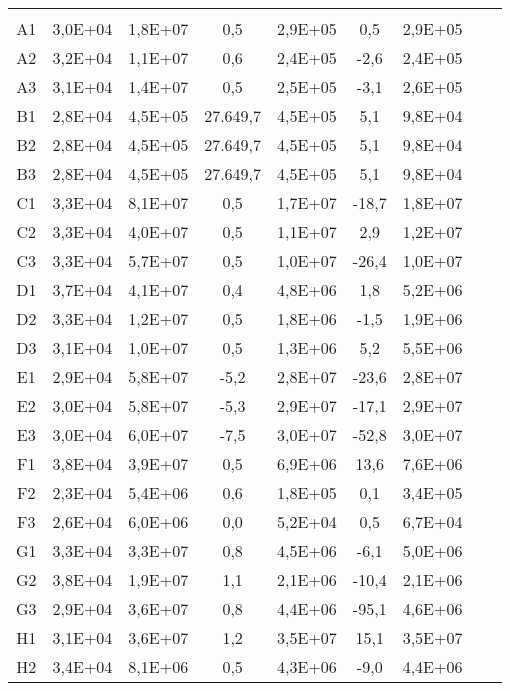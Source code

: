 \begin{center}
\begin{longtable}{ccccccccc}
\toprule
\endhead
\midrule \\ %
\endfoot
\bottomrule 
\endlastfoot
A1    & 3,0E+04 & 1,8E+07 & 0,5   & 2,9E+05 & 0,5   & 2,9E+05 \\
A2    & 3,2E+04 & 1,1E+07 & 0,6   & 2,4E+05 & -2,6  & 2,4E+05 \\
A3    & 3,1E+04 & 1,4E+07 & 0,5   & 2,5E+05 & -3,1  & 2,6E+05 \\
B1    & 2,8E+04 & 4,5E+05 & 27.649,7 & 4,5E+05 & 5,1   & 9,8E+04 \\
B2    & 2,8E+04 & 4,5E+05 & 27.649,7 & 4,5E+05 & 5,1   & 9,8E+04 \\
B3    & 2,8E+04 & 4,5E+05 & 27.649,7 & 4,5E+05 & 5,1   & 9,8E+04 \\
C1    & 3,3E+04 & 8,1E+07 & 0,5   & 1,7E+07 & -18,7 & 1,8E+07 \\
C2    & 3,3E+04 & 4,0E+07 & 0,5   & 1,1E+07 & 2,9   & 1,2E+07 \\
C3    & 3,3E+04 & 5,7E+07 & 0,5   & 1,0E+07 & -26,4 & 1,0E+07 \\
D1    & 3,7E+04 & 4,1E+07 & 0,4   & 4,8E+06 & 1,8   & 5,2E+06 \\
D2    & 3,3E+04 & 1,2E+07 & 0,5   & 1,8E+06 & -1,5  & 1,9E+06 \\
D3    & 3,1E+04 & 1,0E+07 & 0,5   & 1,3E+06 & 5,2   & 5,5E+06 \\
E1    & 2,9E+04 & 5,8E+07 & -5,2  & 2,8E+07 & -23,6 & 2,8E+07 \\
E2    & 3,0E+04 & 5,8E+07 & -5,3  & 2,9E+07 & -17,1 & 2,9E+07 \\
E3    & 3,0E+04 & 6,0E+07 & -7,5  & 3,0E+07 & -52,8 & 3,0E+07 \\
F1    & 3,8E+04 & 3,9E+07 & 0,5   & 6,9E+06 & 13,6  & 7,6E+06 \\
F2    & 2,3E+04 & 5,4E+06 & 0,6   & 1,8E+05 & 0,1   & 3,4E+05 \\
F3    & 2,6E+04 & 6,0E+06 & 0,0   & 5,2E+04 & 0,5   & 6,7E+04 \\
G1    & 3,3E+04 & 3,3E+07 & 0,8   & 4,5E+06 & -6,1  & 5,0E+06 \\
G2    & 3,8E+04 & 1,9E+07 & 1,1   & 2,1E+06 & -10,4 & 2,1E+06 \\
G3    & 2,9E+04 & 3,6E+07 & 0,8   & 4,4E+06 & -95,1 & 4,6E+06 \\
H1    & 3,1E+04 & 3,6E+07 & 1,2   & 3,5E+07 & 15,1  & 3,5E+07 \\
H2    & 3,4E+04 & 8,1E+06 & 0,5   & 4,3E+06 & -9,0  & 4,4E+06 \\

\end{longtable}
\end{center}
